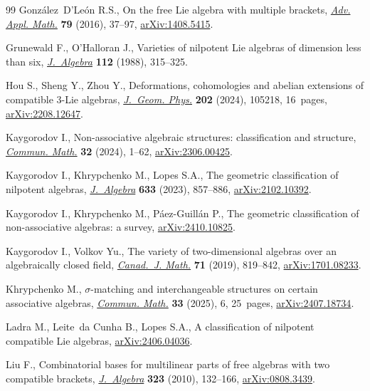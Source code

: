 \documentclass[10pt,a4paper]{amsart}
\numberwithin{equation}{section}
\begin{document}
\begin{thebibliography}{99}
Gonz\'alez~D'Le\'on R.S., On the free {L}ie algebra with multiple brackets,
 \href{https://doi.org/10.1016/j.aam.2016.02.008}{\textit{Adv. Appl. Math.}} \textbf{79} (2016), 37--97, \href{https://arxiv.org/abs/1408.5415}{arXiv:1408.5415}.

Grunewald F., O'Halloran J., Varieties of nilpotent {L}ie algebras of dimension
 less than six, \href{https://doi.org/10.1016/0021-8693(88)90093-2}{\textit{J.~Algebra}} \textbf{112} (1988), 315--325.

Hou S., Sheng Y., Zhou Y., Deformations, cohomologies and abelian extensions of
 compatible 3-{L}ie algebras, \href{https://doi.org/10.1016/j.geomphys.2024.105218}{\textit{J.~Geom. Phys.}} \textbf{202} (2024),
 105218, 16~pages, \href{https://arxiv.org/abs/2208.12647}{arXiv:2208.12647}.

Kaygorodov I., Non-associative algebraic structures: classification and
 structure, \href{https://doi.org/10.46298/cm.11419}{\textit{Commun. Math.}} \textbf{32} (2024), 1--62,
 \href{https://arxiv.org/abs/2306.00425}{arXiv:2306.00425}.

Kaygorodov I., Khrypchenko M., Lopes S.A., The geometric classification of
 nilpotent algebras, \href{https://doi.org/10.1016/j.jalgebra.2023.04.028}{\textit{J.~Algebra}} \textbf{633} (2023), 857--886,
 \href{https://arxiv.org/abs/2102.10392}{arXiv:2102.10392}.

Kaygorodov I., Khrypchenko M., P\'aez-Guill\'an P., The geometric
 classification of non-associative algebras: a survey, \href{https://arxiv.org/abs/2410.10825}{arXiv:2410.10825}.

Kaygorodov I., Volkov Yu., The variety of two-dimensional algebras over an
 algebraically closed field, \href{https://doi.org/10.4153/s0008414x18000056}{\textit{Canad.~J. Math.}} \textbf{71} (2019),
 819--842, \href{https://arxiv.org/abs/1701.08233}{arXiv:1701.08233}.

Khrypchenko M., $\sigma$-matching and interchangeable structures on certain
 associative algebras,
\href{https://doi.org/10.46298/cm.13990}{\textit{Commun. Math.}} \textbf{33} (2025), 6, 25~pages,
 \href{https://arxiv.org/abs/2407.18734}{arXiv:2407.18734}.

Ladra M., Leite~da Cunha B., Lopes S.A., A classification of nilpotent
 compatible Lie algebras, \href{https://arxiv.org/abs/2406.04036}{arXiv:2406.04036}.

Liu F., Combinatorial bases for multilinear parts of free algebras with two
 compatible brackets, \href{https://doi.org/10.1016/j.jalgebra.2009.10.002}{\textit{J.~Algebra}} \textbf{323} (2010), 132--166,
 \href{https://arxiv.org/abs/0808.3439}{arXiv:0808.3439}.


\end{thebibliography}
\end{document}

